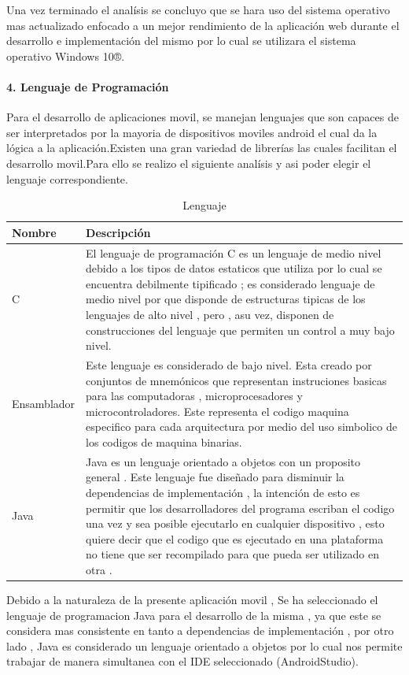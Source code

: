 Una vez terminado el analísis se concluyo que se hara uso del sistema operativo mas actualizado enfocado a un mejor rendimiento de la aplicación web durante el desarrollo e implementación del mismo por lo cual se utilizara el sistema operativo Windows 10®.





\paragraph{4. Lenguaje de Programación} 
Para el desarrollo de aplicaciones movil, se manejan lenguajes  que son capaces de  ser interpretados por la mayoria de dispositivos moviles android el cual da la lógica a la aplicación.Existen una gran variedad de librerías las cuales facilitan el desarrollo movil.Para ello se realizo el siguiente analísis y asi poder elegir el lenguaje correspondiente.

\begin{table}[htbp]
\begin{tabular}{|p{3cm}|p{12cm}|}
\hline
\textbf{Nombre}&\textbf{Descripción}\\
\hline
\hline
C & El lenguaje de programación C es un lenguaje de medio nivel debido a los tipos de datos estaticos que utiliza por lo cual se encuentra debilmente tipificado ; es considerado lenguaje de medio nivel por que disponde de estructuras tipicas de los lenguajes de alto nivel , pero , asu vez, disponen de construcciones del lenguaje que permiten un control a muy bajo nivel. \\
\hline
\hline
Ensamblador & Este lenguaje es considerado de bajo nivel. Esta creado por conjuntos de mnemónicos que representan instruciones basicas para las computadoras , microprocesadores y microcontroladores. Este representa el codigo maquina especifico para cada arquitectura por medio del uso simbolico de los codigos de maquina binarias.\\
\hline
\hline
Java & Java es un lenguaje orientado a objetos con un proposito general . Este lenguaje fue diseñado para disminuir la dependencias de implementación ,  la intención de esto es permitir que los desarrolladores del programa escriban el codigo una vez y sea posible ejecutarlo en cualquier dispositivo , esto quiere decir que el codigo que es ejecutado en una plataforma no tiene que ser recompilado para que pueda ser utilizado en otra . \\
\hline

\end{tabular}
\caption{Lenguaje}
\label{disenoEstructura:Lenguaje}
\end{table}
Debido a la naturaleza de la presente aplicación movil , Se ha seleccionado el lenguaje de programacion Java para el desarrollo de la misma , ya que este se considera mas consistente en tanto a dependencias de implementación , por otro lado , Java es considerado un lenguaje orientado a objetos por lo cual nos permite trabajar de manera simultanea con el IDE seleccionado (AndroidStudio).

